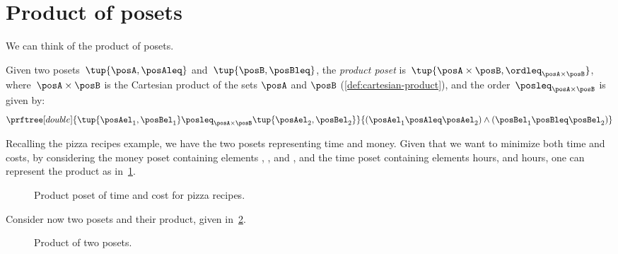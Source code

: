
\section{Product of posets}
We can think of the product of posets.

\begin{definition}
  \label{def:productposet}
  Given two posets~$\tup{\posA, \posAleq}$
  and~$\tup{\posB, \posBleq}$, the \emph{product poset} is~$\tup{\posA \times \posB, \ordleq_{\posA\times \posB}}$, where~$\posA \times \posB$ is the Cartesian product of the sets $\posA$ and $\posB$ (\cref{def:cartesian-product}), and the order~$\posleq_{\posA \times \posB}$ is given by:
  \begin{equation}
    \prftree[double]{\tup{\posAel_1, \posBel_1}
    \posleq_{\posA\times \posB}
    \tup{\posAel_2, \posBel_2}}{(\posAel_1 \posAleq \posAel_2) \wedge
    (\posBel_1 \posBleq \posBel_2)}
  \end{equation}
\end{definition}
Recalling the pizza recipes example, we have the two posets representing time and money.
Given that we want to minimize both time and costs, by considering the money poset containing elements \unit[1]{\stdcurr}, \unit[2]{\stdcurr}, and \unit[3]{\stdcurr}, and the time poset containing elements \unit[1]{hours}, and \unit[2]{hours}, one can represent the product as in~\cref{fig:productpizza}.

\begin{figure}[h!]
  \begin{center}
  \end{center}
  \caption{Product poset of time and cost for pizza recipes.}
  \label{fig:productpizza}
\end{figure}


\begin{example}
  Consider now two posets and their product, given in~\cref{fig:composing_posets_1}.
  \begin{figure}[h!]
    \begin{center}
    \end{center}
    \caption{Product of two posets.\label{fig:composing_posets_1}}
  \end{figure}
\end{example}
